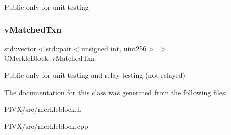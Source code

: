 Public only for unit testing \mbox{\label{class_c_merkle_block_a73bbbdcb5d83588b15461c02d0228999}} 
\subsubsection{\texorpdfstring{v\+Matched\+Txn}{vMatchedTxn}}
{\footnotesize\ttfamily std\+::vector$<$std\+::pair$<$unsigned int, \mbox{\hyperlink{classuint256}{uint256}}$>$ $>$ C\+Merkle\+Block\+::v\+Matched\+Txn}

Public only for unit testing and relay testing (not relayed) 

The documentation for this class was generated from the following files\+:\begin{DoxyCompactItemize}
\item 
P\+I\+V\+X/src/merkleblock.\+h\item 
P\+I\+V\+X/src/merkleblock.\+cpp\end{DoxyCompactItemize}
